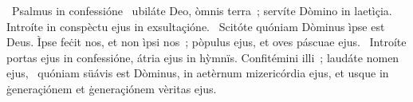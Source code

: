 {~Psalmus in confessióne}
{%
~ubiláte Deo, òmnis terra~; servíte Dòmino in laetìçia. Introíte in conspèctu ejus in exsultaçióne.
~Scitóte quóniam Dòminus ìpse est Deus. Ìpse feċit nos, et non ìpsi nos~; pòpulus ejus, et oves páscuae ejus.
~Introíte portas ejus in confessióne, átria ejus in hỳmnïs. Confitémini illi~; laudáte nomen ejus,
~quóniam süávis est Dòminus, in aetèrnum mizericórdia ejus, et usque in ġeneraçiónem et ġeneraçiónem vèritas ejus.
}
